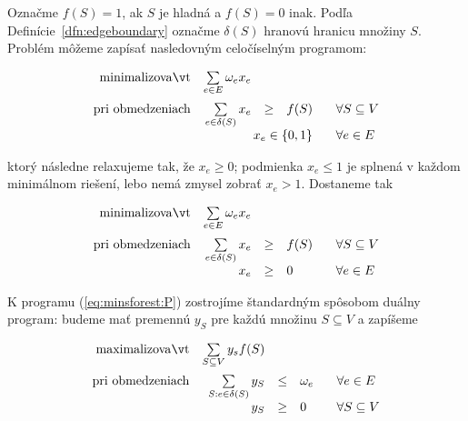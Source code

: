 \noindent
Označme $f(S)=1$, ak $S$ je hladná a $f(S)=0$ inak. Podľa Definície~\ref{dfn:edgeboundary} označme $\delta(S)$
hranovú hranicu množiny $S$. Problém \minsforest môžeme zapísať nasledovným celočíselným programom:

\begin{equation}
  \label{eq:minsforest:ILP}
\begin{array}{rrcll}
  {\rm minimalizovať}     & \multicolumn{1}{l}{\sum\limits_{e\in E}\omega_ex_e}\\[3ex]
  {\rm pri\ obmedzeniach} & \sum\limits_{e\in\delta(S)}x_e&\ge&f(S)& \;\;\;\forall S\subseteq V\\
                          & \multicolumn{3}{r}{x_e\in\{0,1\}}& \;\;\;\forall e\in E\\
\end{array}
\end{equation}

\noindent ktorý následne relaxujeme tak, že $x_e\ge0$; podmienka $x_e\le1$ je splnená v každom minimálnom riešení,
lebo nemá zmysel zobrať $x_e>1$. Dostaneme tak

\begin{equation}
  \label{eq:minsforest:P}
\begin{array}{rrcll}
  {\rm minimalizovať}     & \multicolumn{1}{l}{\sum\limits_{e\in E}\omega_ex_e}\\[3ex]
  {\rm pri\ obmedzeniach} & \sum\limits_{e\in\delta(S)}x_e&\ge&f(S)& \;\;\;\forall S\subseteq V\\
                          & x_e &\ge&0& \;\;\;\forall e\in E\\
\end{array}
\end{equation}

\noindent
K programu (\ref{eq:minsforest:P}) zostrojíme štandardným spôsobom duálny program: budeme mať premennú $y_S$ 
pre každú množinu $S\subseteq V$ a zapíšeme

\begin{equation}
  \label{eq:minsforest:D}
\begin{array}{rrcll}
  {\rm maximalizovať}     & \multicolumn{1}{l}{\sum\limits_{S\subseteq V}y_sf(S)}\\[3ex]
  {\rm pri\ obmedzeniach} & \sum\limits_{S:e\in\delta(S)}y_S&\le&\omega_e& \;\;\;\forall e\in E\\
                          & y_S &\ge&0& \;\;\;\forall S\subseteq V\\
\end{array}
\end{equation}

